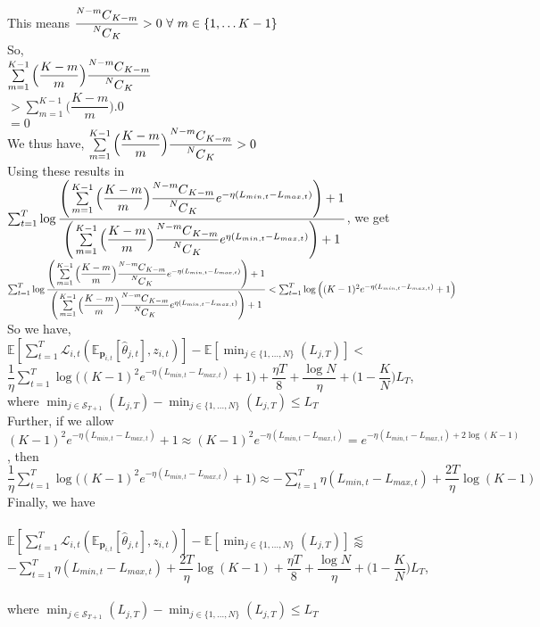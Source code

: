 \documentclass{article}
\newcommand\Mycomb[2][^n]{\prescript{#1\mkern-0.5mu}{}C_{#2}}
\theoremstyle{definition}
\begin{document}
    This means $\dfrac{\Mycomb[N-m]{K-m}}{\Mycomb[N]{K}}>0\ \forall\ m\in\{1,\ldots K-1\}$\\
    So,\\
    $\sum\limits_{m=1}^{K-1}\Big(\dfrac{K-m}{m}\Big){\dfrac{\Mycomb[N-m]{K-m}}{\Mycomb[N]{K}}}$\\
    $>\sum\limits_{m=1}^{K-1}\Big(\dfrac{K-m}{m}\Big).0$\\
    $=0$\\
    We thus have, $\sum\limits_{m=1}^{K-1}\Big(\dfrac{K-m}{m}\Big){\dfrac{\Mycomb[N-m]{K-m}}{\Mycomb[N]{K}}}>0$\\
    Using these results in $\sum_{t=1}^{T}\log{{\dfrac{\Bigg(\sum\limits_{m=1}^{K-1}\Big(\dfrac{K-m}{m}\Big){\dfrac{\Mycomb[N-m]{K-m}}{\Mycomb[N]{K}}}e^{-\eta(L_{min,t}-L_{max,t})}\Bigg)+1}{\Bigg(\sum\limits_{m=1}^{K-1}\Big(\dfrac{K-m}{m}\Big){\dfrac{\Mycomb[N-m]{K-m}}{\Mycomb[N]{K}}}e^{\eta(L_{min,t}-L_{max,t})}\Bigg)+1}}}$, we get\\
    $\sum_{t=1}^{T}\log{{\dfrac{\Bigg(\sum\limits_{m=1}^{K-1}\Big(\dfrac{K-m}{m}\Big){\dfrac{\Mycomb[N-m]{K-m}}{\Mycomb[N]{K}}}e^{-\eta(L_{min,t}-L_{max,t})}\Bigg)+1}{\Bigg(\sum\limits_{m=1}^{K-1}\Big(\dfrac{K-m}{m}\Big){\dfrac{\Mycomb[N-m]{K-m}}{\Mycomb[N]{K}}}e^{\eta(L_{min,t}-L_{max,t})}\Bigg)+1}}}<\sum_{t=1}^{T}\log\Big({(K-1)^{2}e^{-\eta(L_{min,t}-L_{max,t})}+1}\Big)$\\
    So we have,\\
    $\mathbb{E}[\sum_{t=1}^{T}\mathcal{L}_{i,t}(\mathbb{E}_{\bm{p}_{i,t}}[\hat{\theta}_{j,t}],z_{i,t})]-\mathbb{E}[\min_{j\in\{1,\ldots,N\}}(L_{j,T})]<$\\
    $\dfrac{1}{\eta}\sum_{t=1}^{T}\log\Big({(K-1)^{2}e^{-\eta(L_{min,t}-L_{max,t})}+1}\Big)+\dfrac{\eta T}{8}+\dfrac{\log{N}}{\eta}+\Bigg(1-\dfrac{K}{N}\Bigg)L_{T}$,\\ where $\min_{j\in\mathcal{S}_{T+1}}(L_{j,T})-\min_{j\in\{1,\ldots,N\}}(L_{j,T})\leq L_{T}$\\
    Further, if we allow $(K-1)^{2}e^{-\eta(L_{min,t}-L_{max,t})}+1\approx(K-1)^{2}e^{-\eta(L_{min,t}-L_{max,t})}=e^{-\eta(L_{min,t}-L_{max,t})+2\log{(K-1)}}$, then\\
    $\dfrac{1}{\eta}\sum_{t=1}^{T}\log\Big({(K-1)^{2}e^{-\eta(L_{min,t}-L_{max,t})}+1}\Big)\approx-\sum_{t=1}^{T}\eta(L_{min,t}-L_{max,t})+\dfrac{2T}{\eta}\log{(K-1)}$\\
    Finally, we have\\~\\
    $\mathbb{E}[\sum_{t=1}^{T}\mathcal{L}_{i,t}(\mathbb{E}_{\bm{p}_{i,t}}[\hat{\theta}_{j,t}],z_{i,t})]-\mathbb{E}[\min_{j\in\{1,\ldots,N\}}(L_{j,T})]\lessapprox$\\
    $-\sum_{t=1}^{T}\eta(L_{min,t}-L_{max,t})+\dfrac{2T}{\eta}\log{(K-1)}+\dfrac{\eta T}{8}+\dfrac{\log{N}}{\eta}+\Bigg(1-\dfrac{K}{N}\Bigg)L_{T}$,\\~\\ where $\min_{j\in\mathcal{S}_{T+1}}(L_{j,T})-\min_{j\in\{1,\ldots,N\}}(L_{j,T})\leq L_{T}$\\
\end{document}
